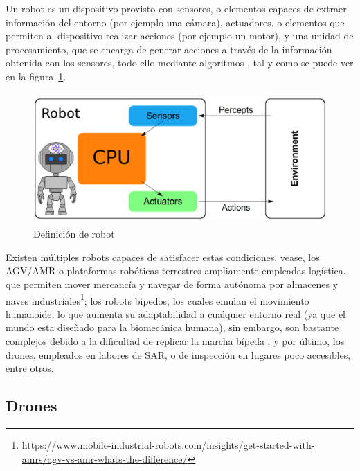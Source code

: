 Un robot es un dispositivo provisto con sensores, o elementos capaces de extraer información del entorno (por ejemplo una cámara), actuadores, o elementos que permiten al dispositivo realizar acciones (por ejemplo un motor), y una unidad de procesamiento, que se encarga de generar acciones a través de la información obtenida con los sensores, todo ello mediante algoritmos \cite{Wang2022}, tal y como se puede ver en la figura~\ref{fig:robot_def}.\\

\begin{figure} [tp]
	\begin{center}
	\includegraphics[height=5cm]{imagenes/cap1/3_robot.png}
	\end{center}
	\caption[Definición de robot]{Definición de robot}
	\label{fig:robot_def}
\end{figure}

Existen múltiples robots capaces de satisfacer estas condiciones, vease, los \ac{AGV}/\ac{AMR} o plataformas robóticas terrestres ampliamente empleadas logística, que permiten mover mercancía y navegar de forma autónoma por almacenes y naves industriales\footnote[6]{\url{https://www.mobile-industrial-robots.com/insights/get-started-with-amrs/agv-vs-amr-whats-the-difference/}}; los robots bipedos, los cuales emulan el movimiento humanoide, lo que aumenta su adaptabilidad a cualquier entorno real (ya que el mundo esta diseñado para la biomecánica humana), sin embargo, son bastante complejos debido a la dificultad de replicar la marcha bípeda \cite{10.3389/fmech.2020.00011}; y por último, los drones, empleados en labores de \ac{SAR}, o de inspección en lugares poco accesibles, entre otros.

\subsection{Drones}
\label{subsec:drones}

